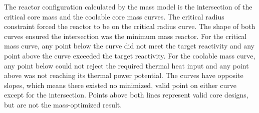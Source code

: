 The reactor configuration calculated by the mass model is the intersection of
the critical core mass and the coolable core mass curves. The critical radius
constraint forced the reactor to be on the critical radius curve. The shape of
both curves ensured the intersection was the minimum mass reactor. For the
critical mass curve, any point below the curve did not meet the target
reactivity and any point above the curve exceeded the target reactivity. For the
coolable mass curve, any point below could not reject the required thermal heat
input and any point above was not reaching its thermal power potential. The
curves have opposite slopes, which means there existed no minimized, valid point on either
curve except for the intersection. Points above both lines represent valid
core designs, but are not the mass-optimized result.
